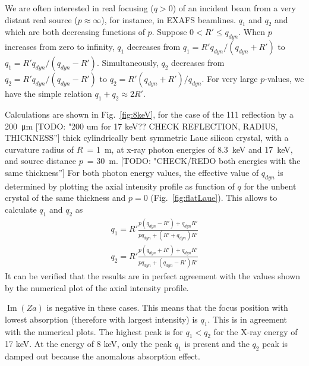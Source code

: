 \documentclass[preprint]{iucr}              %
\newcommand{\todo}[1]{{\color{red}[TODO: "#1'']}}
\newcommand{\inblue}[1]{{\color{blue}#1}}
\begin{document}
We are often interested in real focusing ($q>0$) of an incident beam from a very distant real source ($p\approx \infty$), for instance, in EXAFS beamlines. $q_1$ and $q_2$ and which are both decreasing functions of $p$. Suppose $0<R'\le q_{dyn}$. When $p$ increases from zero to infinity, $q_1$ decreases from $q_1=R'q_{dyn}/(q_{dyn}+R')$ to $q_1=R'q_{dyn}/(q_{dyn}-R')$. Simultaneously, $q_2$ decreases from $q_2=R'q_{dyn}/(q_{dyn}-R')$ to $q_2=R'(q_{dyn}+R')/q_{dyn}$. For very large $p$-values, we have the simple relation $q_1+q_2\approx 2R'$.

Calculations are shown in Fig.~\ref{fig:8keV}, for the case of the 111 reflection by a \SI{200}{\micro\meter} \todo{200 um for 17 keV?? CHECK REFLECTION, RADIUS, THICKNESS} thick cylindrically bent symmetric Laue silicon crystal, with a curvature radius of $R$~= \SI{1}{\meter}, at x-ray photon energies of 8.3~keV and 17~keV, and source distance $p$~= \SI{30}{\meter}. 
\todo{CHECK/REDO both energies with the same thickness}
For both photon energy values, the effective value of $q_{dyn}$ is determined by plotting the axial intensity profile as function of $q$ for the unbent crystal of the same thickness and $p=0$ \inblue(Fig.~\ref{fig:flatLaue}). This allows to calculate $q_1$ and $q_2$ as
\begin{multline}
\label{eq:q1andq2}
q_1 = R' \frac{p(q_{dyn}-R')+q_{dyn}R'}{p q_{dyn}+(R'+q_{dyn})R'} \\
q_2 = R' \frac{p(q_{dyn}+R')+q_{dyn}R'}{p q_{dyn}+(q_{dyn}-R')R'}
\end{multline}
 It can be verified that the results are in perfect agreement with the values shown by the numerical plot of the axial intensity profile.
 
 $\operatorname{Im}(Za)$ is negative in these cases. This means that the focus position with lowest absorption (therefore with largest intensity) is $q_1$. This is in agreement with the numerical plots. 
The highest peak is for $q_1<q_2$ for the X-ray energy of 17 keV. At the energy of 8 keV, only the  peak $q_1$ is present and the $q_2$ peak is damped out because the anomalous absorption effect.
\end{document}
